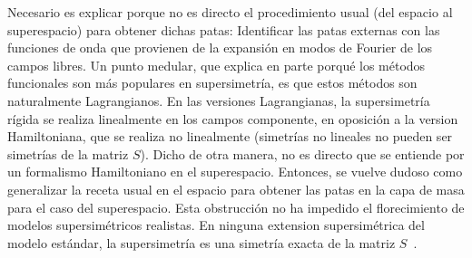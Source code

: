 Necesario es explicar porque  no es directo el procedimiento usual (del espacio al superespacio) para obtener dichas patas: Identificar las patas externas con las funciones de onda que provienen de la expansión en modos de Fourier de los campos libres. Un punto medular, que explica en parte porqué los métodos funcionales son más populares en supersimetría, es que estos métodos son naturalmente Lagrangianos. En las versiones Lagrangianas,  la  supersimetría rígida se realiza linealmente en los campos componente, en oposición  a la version Hamiltoniana, que se realiza no linealmente (simetrías no lineales no pueden ser simetrías de la matriz ${S} $). Dicho de otra manera, no es directo que se entiende por un  formalismo Hamiltoniano en el superespacio. Entonces, se vuelve dudoso como generalizar la receta usual en el espacio para obtener las patas en la capa de masa para el caso del superespacio. Esta obstrucción no ha impedido el florecimiento de  modelos supersimétricos realistas. En ninguna extension supersimétrica del modelo estándar, la supersimetría es una  simetría exacta de la matriz $ {S} $~\cite{Dimopoulos:1981zb}. %


